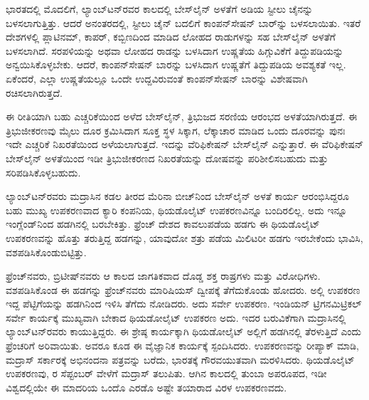 ಭಾರತದಲ್ಲಿ ಮೊದಲಿಗೆ, ಲ್ಯಾಂಬ್​ಟನ್​ರವರ ಕಾಲದಲ್ಲಿ ಬೇಸ್‌ಲೈನ್​ ಅಳತೆಗೆ  ಅಡಿಯ ಸ್ಟೀಲು ಚೈನನ್ನು ಬಳಸಲಾಗುತ್ತಿತ್ತು. ಆದರೆ ಅನಂತರದಲ್ಲಿ, ಸ್ಟೀಲು ಚೈನ್​ ಬದಲಿಗೆ ಕಾಂಪನ್​ಸೇಷನ್​ ಬಾರ್​ನ್ನು ಬಳಸಲಾಯಿತು. ಇತರೆ ದೇಶಗಳಲ್ಲಿ ಪ್ಲಾಟಿನಮ್, ಕಾಪರ್​, ಕಬ್ಬಿಣದಿಂದ ಮಾಡಿದ ಲೋಹದ ರಾಡುಗಳನ್ನು ಸಹ ಬೇಸ್‌ಲೈನ್​ ಅಳತೆಗೆ ಬಳಸಲಾಗಿದೆ. ಸರಪಳಿಯನ್ನು ಅಥವಾ ಲೋಹದ ರಾಡನ್ನು ಬಳಸಿದಾಗ ಉಷ್ಣತೆಯ ಹಿಗ್ಗುವಿಕೆಗೆ ತಿದ್ದುಪಡಿಯನ್ನು ಅನ್ವಯಿಸಿಕೊಳ್ಳಬೇಕು. ಆದರೆ, ಕಾಂಪನ್​ಸೇಷನ್​ ಬಾರನ್ನು ಬಳಸಿದಾಗ ಉಷ್ಣತೆಗೆ ತಿದ್ದುಪಡಿಯ ಅವಶ್ಯಕತೆ ಇಲ್ಲ. ಏಕೆಂದರೆ, ಎಲ್ಲಾ ಉಷ್ಣತೆಯಲ್ಲೂ ಒಂದೇ ಉದ್ದವಿರುವಂತೆ ಕಾಂಪನ್​ಸೇಷನ್​ ಬಾರನ್ನು ವಿಶೇಷವಾಗಿ ರಚಿಸಲಾಗಿರುತ್ತದೆ.

ಈ ರೀತಿಯಾಗಿ ಬಹು ಎಚ್ಚರಿಕೆಯಿಂದ ಅಳೆದ ಬೇಸ್‌ಲೈನ್​, ತ್ರಿಭುಜದ ಸರಣಿಯ ಆರಂಭದ ಅಳತೆಯಾಗಿರುತ್ತದೆ. ಈ ತ್ರಿಭುಜೀಕರಣವು  ಮೈಲು ದೂರ ಕ್ರಮಿಸಿದಾಗ ಸೂಕ್ತ ಸ್ಥಳ ಸಿಕ್ಕಾಗ, ಲೆಕ್ಕಾಚಾರ ಮಾಡಿದ ಒಂದು ದೂರವನ್ನು ಪುನಃ ಇದೇ ಎಚ್ಚರಿಕೆ ನಿಖರತೆಯಿಂದ ಅಳೆಯಲಾಗುತ್ತದೆ. ಇದನ್ನು ವೆರಿಫಿಕೇಷನ್​ ಬೇಸ್‌ಲೈನ್​ ಎನ್ನುತ್ತಾರೆ. ಈ ವೆರಿಫಿಕೇಷನ್​ ಬೇಸ್‌ಲೈನ್​ ಅಳತೆಯಿಂದ ಇಡೀ ತ್ರಿಭುಜೀಕರಣದ ನಿಖರತೆಯನ್ನು ದೋಷವನ್ನು ಪರಿಶೀಲಿಸಬಹುದು ಮತ್ತು ಸರಿಪಡಿಸಿಕೊಳ್ಳಬಹುದು.

ಲ್ಯಾಂಬ್​ಟನ್​ರವರು ಮದ್ರಾಸಿನ ಕಡಲ ತೀರದ ಮೆರಿನಾ ಬೀಚ್​ನಿಂದ ಬೇಸ್‌ಲೈನ್​ ಅಳತೆ ಕಾರ್ಯ ಆರಂಭಿಸಿದ್ದರೂ ಬಹು ಮುಖ್ಯ ಉಪಕರಣವಾದ ಕ್ಯಾರಿ ಕಂಪನಿಯ, ಥಿಯಡೊಲೈಟ್​ ಉಪಕರಣವಿನ್ನೂ ಬಂದಿರಲಿಲ್ಲ. ಅದು ಇನ್ನೂ ಇಂಗ್ಲೆಂಡ್​ನಿಂದ ಹಡಗಿನಲ್ಲಿ ಬರಬೇಕಿತ್ತು. ಫ್ರೆಂಚ್​ ದೇಶದ ಕಾವಲುಪಡೆಯ ಹಡಗು ಈ ಥಿಯಡೊಲೈಟ್​ ಉಪಕರಣವನ್ನು ಹೊತ್ತು ತರುತ್ತಿದ್ದ ಹಡಗನ್ನು, ಯಾವುದೋ ಶತ್ರು ಪಡೆಯ ಮಿಲಿಟರೀ ಹಡಗು ಇರಬೇಕೆಂದು ಭಾವಿಸಿ, ವಶಪಡಿಸಿಕೊಂಡುಬಿಟ್ಟಿತ್ತು.

ಫ್ರೆಂಚ್​ನವರು, ಬ್ರಿಟೀಷ್​ನವರು ಆ ಕಾಲದ ಜಾಗತಿಕವಾದ ದೊಡ್ಡ ಶಕ್ತ ರಾಷ್ರಗಳು ಮತ್ತು ವಿರೋಧಿಗಳು. ವಶಪಡಿಸಿಕೊಂಡ ಈ ಹಡಗನ್ನು ಫ್ರೆಂಚ್​ನವರು ಮಾರಿಷಿಯಸ್​ ದ್ವೀಪಕ್ಕೆ ತೆಗೆದುಕೊಂಡು ಹೋದರು. ಅಲ್ಲಿ ಉಪಕರಣ ಇದ್ದ ಪೆಟ್ಟಿಗೆಯನ್ನು ಹಡಗಿನಿಂದ ಇಳಿಸಿ ತೆಗೆದು ನೋಡಿದರು. ಅದು ಸರ್ವೇ ಉಪಕರಣ. ಇಂಡಿಯನ್​ ಟ್ರಿಗನಮಿಟ್ರಿಕಲ್​ ಸರ್ವೇ ಕಾರ್ಯಕ್ಕೆ ಮುಖ್ಯವಾಗಿ ಬೇಕಾದ ಥಿಯಡೋಲೈಟ್​ ಉಪಕರಣ ಅದು. ಇದರ ಬರುವಿಕೆಗಾಗಿ ಮದ್ರಾಸಿನಲ್ಲಿ ಲ್ಯಾಂಬ್​ಟನ್​ರವರು ಕಾಯುತ್ತಿದ್ದರು. ಈ ಶ್ರೇಷ್ಠ ಕಾರ್ಯಕ್ಕಾಗಿ ಥಿಯಡೋಲೈಟ್​ ಅಲ್ಲಿಗೆ ಹಡಗಿನಲ್ಲಿ ತೆರಳುತ್ತಿದೆ ಎಂದು ಫ್ರೆಂಚರಿಗೆ ಅರಿವಾಯಿತು. ಅವರೂ ಕೂಡ ಈ ವೈಜ್ಞಾನಿಕ ಕಾರ್ಯಕ್ಕೆ ಸ್ಪಂದಿಸಿದರು. ಉಪಕರಣವನ್ನು ರೀಪ್ಯಾಕ್​ ಮಾಡಿ, ಮದ್ರಾಸ್​ ಸರ್ಕಾರಕ್ಕೆ ಅಭಿನಂದನಾ ಪತ್ರವನ್ನು ಬರೆದು, ಭಾರತಕ್ಕೆ ಗೌರವಯುತವಾಗಿ ಮರಳಿಸಿದರು. ಥಿಯಡೊಲೈಟ್​ ಉಪಕರಣವು, ರ ಸೆಪ್ಟಂಬರ್​ ವೇಳೆಗೆ ಮದ್ರಾಸ್​ ತಲುಪಿತು. ಆಗಿನ ಕಾಲದಲ್ಲಿ ತುಂಬಾ ಅಪರೂಪದ, ಇಡೀ ವಿಶ್ವದಲ್ಲಿಯೇ ಈ ಮಾದರಿಯ ಒಂದೊ ಎರಡೊ ಅಷ್ಟೇ ತಯಾರಾದ ವಿರಳ ಉಪಕರಣವದು.

